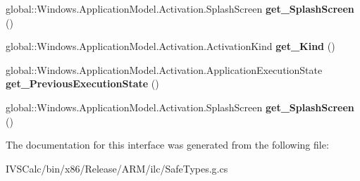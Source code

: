 \begin{DoxyCompactItemize}
\item 
\mbox{\label{interface_windows_1_1_application_model_1_1_activation_1_1_i_activated_event_args_a782c2a15d296b0422175e334ea04039c}} 
global\+::\+Windows.\+Application\+Model.\+Activation.\+Splash\+Screen {\bfseries get\+\_\+\+Splash\+Screen} ()
\item 
\mbox{\label{interface_windows_1_1_application_model_1_1_activation_1_1_i_activated_event_args_ae3df998eda324e7f240cbb1506811f7f}} 
global\+::\+Windows.\+Application\+Model.\+Activation.\+Activation\+Kind {\bfseries get\+\_\+\+Kind} ()
\item 
\mbox{\label{interface_windows_1_1_application_model_1_1_activation_1_1_i_activated_event_args_aa734f32f7c7386e843c56f98215083bf}} 
global\+::\+Windows.\+Application\+Model.\+Activation.\+Application\+Execution\+State {\bfseries get\+\_\+\+Previous\+Execution\+State} ()
\item 
\mbox{\label{interface_windows_1_1_application_model_1_1_activation_1_1_i_activated_event_args_a782c2a15d296b0422175e334ea04039c}} 
global\+::\+Windows.\+Application\+Model.\+Activation.\+Splash\+Screen {\bfseries get\+\_\+\+Splash\+Screen} ()
\end{DoxyCompactItemize}


The documentation for this interface was generated from the following file\+:\begin{DoxyCompactItemize}
\item 
I\+V\+S\+Calc/bin/x86/\+Release/\+A\+R\+M/ilc/Safe\+Types.\+g.\+cs\end{DoxyCompactItemize}
